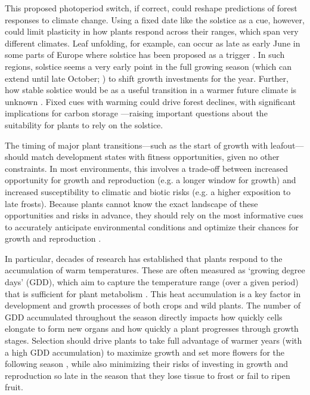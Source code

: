 \documentclass[11pt,letter]{article}
\begin{document}
This proposed photoperiod switch, if correct, could reshape predictions of forest responses to climate change. 
Using a fixed date like the solstice as a cue, however, could limit plasticity in how plants respond across their ranges, which span very different climates.
Leaf unfolding, for example, can occur as late as early June in some parts of Europe where solstice has been proposed as a trigger \citep{Zhang2022}. In such regions, solstice seems a very early point in the full growing season (which can extend until late October; \citealp{Liu2020}) to shift growth investments for the year. Further, how stable solstice would be as a useful transition in a warmer future climate is unknown \citep{Bonamour2019}. 
Fixed cues with warming could drive forest declines, with significant implications for carbon storage \citep{green2022limits}---raising important questions about the suitability for plants to rely on the solstice. 

The timing of major plant transitions---such as the start of growth with leafout---should match development states with fitness opportunities, given no other constraints. In most environments, this involves a trade-off between increased opportunity for growth and reproduction (e.g. a longer window for growth) and increased susceptibility to climatic and biotic risks (e.g. a higher exposition to late frosts). Because plants cannot know the exact landscape of these opportunities and risks in advance, they should rely on the most informative cues to accurately anticipate environmental conditions and optimize their chances for growth and reproduction \citep{Chevin2015, Bonamour2019}.

In particular, decades of research has established that plants respond to the accumulation of warm temperatures. These are often measured as `growing degree days' (GDD), which aim to capture the temperature range (over a given period) that is sufficient for plant metabolism \citep{Chuine2017}.
This heat accumulation is a key factor in development and growth processes of both crops and wild plants. The number of GDD accumulated throughout the season directly impacts how quickly cells elongate to form new organs and how quickly a plant progresses through growth stages. Selection should drive plants to take full advantage of warmer years (with a high GDD accumulation) to maximize growth and set more flowers for the following season \citep{larcher1980}, while also minimizing their risks of investing in growth and reproduction so late in the season that they lose tissue to frost or fail to ripen fruit.
\end{document}
